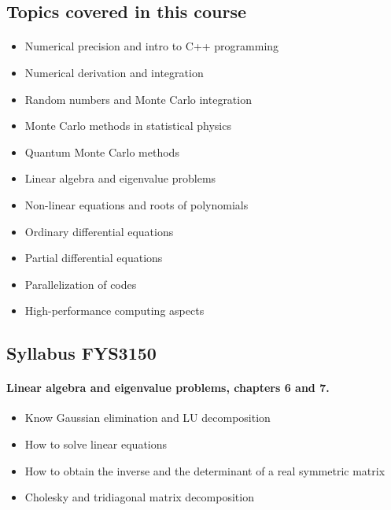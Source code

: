 \documentclass[%
oneside,                 %
final,                   %
10pt]{article}
\begin{document}
\noindent



\subsection{Topics covered in this course}


\paragraph{}
\begin{itemize}
  \item Numerical precision and intro to C++ programming

  \item Numerical derivation and integration

  \item Random numbers and Monte Carlo integration

  \item Monte Carlo methods in statistical physics

  \item Quantum Monte Carlo methods

  \item Linear algebra and eigenvalue problems

  \item Non-linear equations and roots of polynomials

  \item Ordinary differential equations

  \item Partial differential equations

  \item Parallelization of codes

  \item High-performance computing aspects
\end{itemize}

\noindent




\subsection{Syllabus FYS3150}


\paragraph{Linear algebra and eigenvalue problems, chapters 6 and 7.}
\begin{itemize}
  \item Know Gaussian elimination and LU decomposition

  \item How to solve linear equations

  \item How to obtain the inverse and the determinant of a real symmetric matrix

  \item Cholesky and tridiagonal matrix decomposition
\end{itemize}
\end{document}
